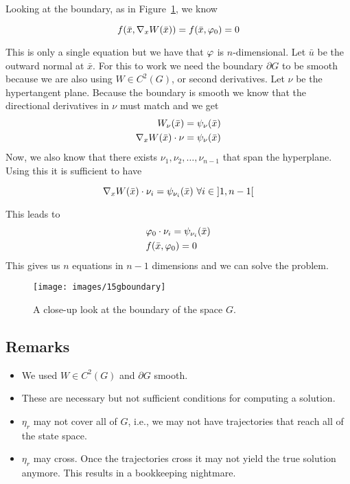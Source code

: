 Looking at the boundary, as in Figure~\ref{fig:15gboundary}, we know

\begin{equation*}
f(\bar{x},\nabla_xW(\bar{x})) = f(\bar{x},\varphi_0) = 0
\end{equation*}

This is only a single equation but we have that $\varphi$ is $n$-dimensional.
Let $\bar{u}$ be the outward normal at $\bar{x}$.
For this to work we need the boundary $\partial G$ to be smooth because we are also using $W\in C^2(G)$, or second derivatives.
Let $\nu$ be the hypertangent plane.
Because the boundary is smooth we know that the directional derivatives in $\nu$ must match and we get
\begin{align*}
W_\nu(\bar{x}) &= \psi_\nu(\bar{x}) \\
\nabla_xW(\bar{x})\cdot \nu &= \psi_\nu(\bar{x})
\end{align*}
Now, we also know that there exists $\nu_1,\nu_2,\ldots,\nu_{n-1}$ that span the hyperplane.
Using this it is sufficient to have

\begin{equation*}
\nw(\bar{x})\cdot\nu_i = \psi_{\nu_i}(\bar{x})~\forall i\in\interval[open]{1}{n-1}
\end{equation*}

This leads to
\begin{align*}
&\varphi_0\cdot\nu_i = \psi_{\nu_i}(\bar{x}) \\
&f(\bar{x},\varphi_0) = 0
\end{align*}
This gives us $n$ equations in $n-1$ dimensions and we can solve the problem.

\begin{figure}[ht!]
\centering
\texttt{[image: images/15gboundary]}
\caption{A close-up look at the boundary of the space $G$.}%
\label{fig:15gboundary}
\end{figure}

\subsection{Remarks}
\begin{itemize}
\item We used $W\in C^2(G)$ and $\partial G$ smooth.
\item These are necessary but not sufficient conditions for computing a solution.
\item $\eta_r$ may not cover all of $G$, i.e., we may not have trajectories that reach all of the state space.
\item $\eta_r$ may cross.
      Once the trajectories cross it may not yield the true solution anymore.
      This results in a bookkeeping nightmare.
\end{itemize}

